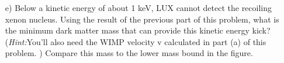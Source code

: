 {\begin{itemize}
\item[e)]
Below a kinetic energy of about 1 keV, LUX cannot detect the recoiling xenon nucleus. 
Using the result of the previous part of this problem, what is the minimum dark matter mass that can provide this kinetic energy kick? 
(\textit{Hint:}You’ll also need the WIMP velocity v calculated in part (a) of this problem. )
Compare this mass to the lower mass bound in the figure. 

\end{itemize}
 




}






